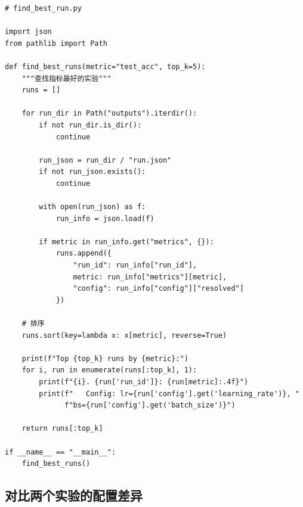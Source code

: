 \begin{verbatim}
# find_best_run.py

import json
from pathlib import Path

def find_best_runs(metric="test_acc", top_k=5):
    """查找指标最好的实验"""
    runs = []

    for run_dir in Path("outputs").iterdir():
        if not run_dir.is_dir():
            continue

        run_json = run_dir / "run.json"
        if not run_json.exists():
            continue

        with open(run_json) as f:
            run_info = json.load(f)

        if metric in run_info.get("metrics", {}):
            runs.append({
                "run_id": run_info["run_id"],
                metric: run_info["metrics"][metric],
                "config": run_info["config"]["resolved"]
            })

    # 排序
    runs.sort(key=lambda x: x[metric], reverse=True)

    print(f"Top {top_k} runs by {metric}:")
    for i, run in enumerate(runs[:top_k], 1):
        print(f"{i}. {run['run_id']}: {run[metric]:.4f}")
        print(f"   Config: lr={run['config'].get('learning_rate')}, "
              f"bs={run['config'].get('batch_size')}")

    return runs[:top_k]

if __name__ == "__main__":
    find_best_runs()
\end{verbatim}

\subsection{对比两个实验的配置差异}

